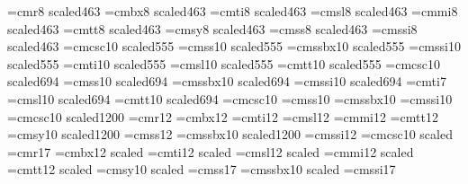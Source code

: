 \newcount\fontsize
\newcount\fontmode
\font\threerm=cmr8 scaled463
\font\threebf=cmbx8 scaled463
\font\threeit=cmti8 scaled463
\font\threesl=cmsl8 scaled463
\font\threei=cmmi8 scaled463
\font\threett=cmtt8 scaled463
\font\threesy=cmsy8 scaled463
\font\threess=cmss8 scaled463
\font\threessit=cmssi8 scaled463
\font\fivesc=cmcsc10 scaled555
\font\fivess=cmss10 scaled555
\font\fivessbf=cmssbx10 scaled555
\font\fivessit=cmssi10 scaled555
\font\fiveit=cmti10 scaled555
\font\fivesl=cmsl10 scaled555
\font\fivett=cmtt10 scaled555
\font\sevensc=cmcsc10 scaled694
\font\sevenss=cmss10 scaled694
\font\sevenssbf=cmssbx10 scaled694
\font\sevenssit=cmssi10 scaled694
\font\sevenit=cmti7
\font\sevensl=cmsl10 scaled694
\font\seventt=cmtt10 scaled694
\font\tensc=cmcsc10
\font\tenss=cmss10
\font\tenssbf=cmssbx10
\font\tenssit=cmssi10
\font\twelvesc=cmcsc10 scaled1200
\font\twelverm=cmr12
\font\twelvebf=cmbx12
\font\twelveit=cmti12
\font\twelvesl=cmsl12
\font\twelvei=cmmi12
\font\twelvett=cmtt12
\font\twelvesy=cmsy10 scaled1200
\font\twelvess=cmss12
\font\twelvessbf=cmssbx10 scaled1200
\font\twelvessit=cmssi12
\font\seventeensc=cmcsc10 scaled
\font\seventeenrm=cmr17
\font\seventeenbf=cmbx12 scaled
\font\seventeenit=cmti12 scaled
\font\seventeensl=cmsl12 scaled
\font\seventeeni=cmmi12 scaled
\font\seventeentt=cmtt12 scaled
\font\seventeensy=cmsy10 scaled
\font\seventeenss=cmss17
\font\seventeenssbf=cmssbx10 scaled
\font\seventeenssit=cmssi17
\def\smallerfonts{\fontsize=0\ifnum\fontmode=0%
\textfont0=\fiverm \scriptfont0=\threerm \scriptscriptfont0=\threerm%
\def\rm{\fam0 \fiverm}%
\def\it{\fam\itfam\fiveit}\textfont\itfam=\fiveit%
\scriptfont\itfam=\threeit \scriptscriptfont\itfam=\threeit%
\def\bf{\fam\bffam\fivebf}\textfont\bffam=\fivebf%
\scriptfont\bffam=\threebf \scriptscriptfont\bffam=\threebf%
\else\ifnum\fontmode<0%
\textfont0=\fivess \scriptfont0=\threess \scriptscriptfont0=\threess%
\def\rm{\fam0 \fivess}%
\else%
\textfont0=\fivesc \scriptfont0=\threerm \scriptscriptfont0=\threerm%
\def\rm{\fam0 \fivesc}%
\fi\def\it{\fam\itfam\fivessit}\textfont\itfam=\fivessit%
\scriptfont\itfam=\threessit \scriptscriptfont\itfam=\threessit%
\def\bf{\fam\bffam\fivessbf}\textfont\bffam=\fivessbf%
\scriptfont\bffam=\threebf \scriptscriptfont\bffam=\threebf%
\fi%
\textfont1=\fivei \scriptfont1=\threei \scriptscriptfont1=\threei%
\def\mit{\fam1 }\def\oldstyle{\fam1 \fivei}%
\textfont2=\fivesy \scriptfont2=\threesy \scriptscriptfont2=\threesy%
\def\cal{\fam2}%
\textfont3=\tenex \scriptfont3=\tenex \scriptscriptfont3=\tenex%
\def\sl{\fam\slfam\fivesl}\textfont\slfam=\fivesl%
\scriptfont\slfam=\threesl \scriptscriptfont\slfam=\threesl%
\def\tt{\fam\ttfam\fivett}\textfont\ttfam=\fivett%
\scriptfont\ttfam=\threett \scriptscriptfont\ttfam=\threett%
\currentlineskip=8pt\setbaselineskip\rm%
}
